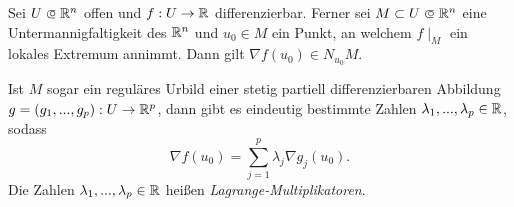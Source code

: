 \documentclass{cheat-sheet}
\begin{document}
\begin{satz}
  Sei $U \opn \R^n$ offen und $f : U \to \mathbb{R}$ differenzierbar. Ferner sei $M \subset U \opn \R^n$ eine Untermannigfaltigkeit des $\mathbb{R}^n$ und $u_0 \in M$ ein Punkt, an welchem $f\mid_M$ ein lokales Extremum annimmt. Dann gilt $\nabla f(u_0) \in N_{u_0} M$.

  Ist $M$ sogar ein reguläres Urbild einer stetig partiell differenzierbaren Abbildung $ g = (g_1, ..., g_p) : U \to \mathbb{R}^p$, dann gibt es eindeutig bestimmte Zahlen $\lambda_1, ..., \lambda_p \in \mathbb{R}$, sodass
  \[ \nabla f(u_0) = \sum_{j = 1}^{p} \lambda_j \nabla g_j(u_0). \]
  Die Zahlen $\lambda_1, ..., \lambda_p \in \mathbb{R}$ heißen \emph{Lagrange-Multiplikatoren}.
\end{satz}
\end{document}
